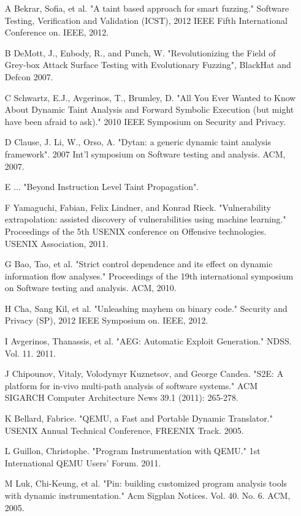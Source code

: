 \documentclass[11pt,expanded,copyright]{fsuthesis}
\begin{document}
\begin{itemize}
	\item [A] Bekrar, Sofia, et al. "A taint based approach for smart fuzzing." Software Testing, Verification and Validation (ICST), 2012 IEEE Fifth International Conference on. IEEE, 2012.
	\item [B] DeMott, J., Enbody, R., and Punch, W. "Revolutionizing the Field of Grey-box Attack Surface Testing with
Evolutionary Fuzzing", BlackHat and Defcon 2007.
	\item [C] Schwartz, E.J., Avgerinos, T., Brumley, D. "All You Ever Wanted to Know About Dynamic Taint Analysis and Forward Symbolic Execution (but might have been afraid to ask)." 2010 IEEE Symposium on Security and Privacy.
	\item [D] Clause, J. Li, W., Orso, A. "Dytan: a generic dynamic taint analysis framework". 2007 Int'l symposium on Software testing and analysis. ACM, 2007.
	\item [E] ... "Beyond Instruction Level Taint Propagation".
	\item [F] Yamaguchi, Fabian, Felix Lindner, and Konrad Rieck. "Vulnerability extrapolation: assisted discovery of vulnerabilities using machine learning." Proceedings of the 5th USENIX conference on Offensive technologies. USENIX Association, 2011.
	\item [G] Bao, Tao, et al. "Strict control dependence and its effect on dynamic information flow analyses." Proceedings of the 19th international symposium on Software testing and analysis. ACM, 2010.
	\item [H] Cha, Sang Kil, et al. "Unleashing mayhem on binary code." Security and Privacy (SP), 2012 IEEE Symposium on. IEEE, 2012.
	\item [I] Avgerinos, Thanassis, et al. "AEG: Automatic Exploit Generation." NDSS. Vol. 11. 2011.
	\item [J] Chipounov, Vitaly, Volodymyr Kuznetsov, and George Candea. "S2E: A platform for in-vivo multi-path analysis of software systems." ACM SIGARCH Computer Architecture News 39.1 (2011): 265-278.
	\item [K] Bellard, Fabrice. "QEMU, a Fast and Portable Dynamic Translator." USENIX Annual Technical Conference, FREENIX Track. 2005.
	\item [L] Guillon, Christophe. "Program Instrumentation with QEMU." 1st International QEMU Users’ Forum. 2011.
	\item [M] Luk, Chi-Keung, et al. "Pin: building customized program analysis tools with dynamic instrumentation." Acm Sigplan Notices. Vol. 40. No. 6. ACM, 2005.

\end{itemize}
\end{document}
